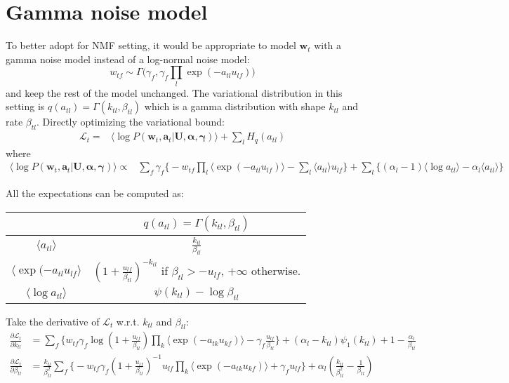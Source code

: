 \documentclass{article}
\begin{document}
\section{Gamma noise model}

To better adopt for NMF setting, it would be appropriate to model $\bm{w}_t$ with a gamma noise model instead of a log-normal noise model:
\[
w_{tf} \sim \Gamma\Big(\gamma_f, \gamma_f  \prod_l \exp(-a_{tl} u_{lf})\Big)
\]
and keep the rest of the model unchanged. The variational distribution in this setting is $q(a_{tl}) = \Gamma(k_{tl}, \beta_{tl})$ which is a gamma distribution with shape $k_{tl}$ and rate $\beta_{tl}$. Directly optimizing the variational bound:
\begin{align*}
\mathcal{L}_t=&  \langle \log P(\bm{w}_t, \bm{a}_t | \mathbf{U}, \bm{\alpha}, \bm{\gamma}) \rangle + \sum_l H_q (a_{tl})
\end{align*}
where
\begin{align*}
 \langle \log P(\bm{w}_t, \bm{a}_t | \mathbf{U}, \bm{\alpha}, \bm{\gamma}) \rangle  \propto & \sum_f \gamma_f \biggl\{-w_{tf} \prod_{l} \langle \exp(-a_{tl} u_{lf}) \rangle - \sum_l \langle a_{tl} \rangle u_{lf} \biggl\}  + \sum_l  \biggl\{ (\alpha_l - 1) \langle \log a_{tl} \rangle - \alpha_l \langle a_{tl} \rangle \biggl\}
\end{align*}

All the expectations can be computed as:
\begin{center}
\begin{tabular} { c || c  }
& $q(a_{tl}) = \Gamma(k_{tl}, \beta_{tl})$ \\ \hline
$\langle a_{tl} \rangle$  &  $\frac{k_{tl}}{\beta_{tl}}$ \\ \hline
$\langle \exp(-a_{tl}u_{lf} \rangle$ & $(1 + \frac{u_{lf}}{\beta_{tl}})^{-k_{tl}}$ if $\beta_{tl} > -u_{lf}$, $+\infty$ otherwise.\\ \hline
$\langle \log a_{tl} \rangle$ & $\psi(k_{tl}) - \log \beta_{tl}$ \\
\end{tabular}
\end{center}

Take the derivative of $\mathcal{L}_t$ w.r.t. $k_{tl}$ and $\beta_{tl}$:
\begin{align*}
\frac{\partial \mathcal{L}_t}{\partial k_{tl}} &= \sum_f \biggl\{ w_{tf} \gamma_f \log(1 + \frac{u_{lf}}{\beta_{tl}}) \prod_{k} \langle \exp(-a_{tk} u_{kf}) \rangle - \gamma_f \frac{u_{lf}}{\beta_{tl}} \biggl\} + (\alpha_l - k_{tl}) \psi_1(k_{tl}) + 1 - \frac{\alpha_l}{\beta_{tl}}\\
\frac{\partial \mathcal{L}_t}{\partial \beta_{tl}} &= \frac{k_{tl}}{\beta_{tl}^2} \sum_f \biggl\{ -w_{tf} \gamma_f (1 + \frac{u_{lf}}{\beta_{tl}})^{-1} u_{lf} \prod_{k} \langle \exp(-a_{tk} u_{kf}) \rangle + \gamma_f u_{lf} \biggl\} + \alpha_l (\frac{k_{tl}}{\beta_{tl}^2} - \frac{1}{\beta_{tl}})
\end{align*}
\end{document}
